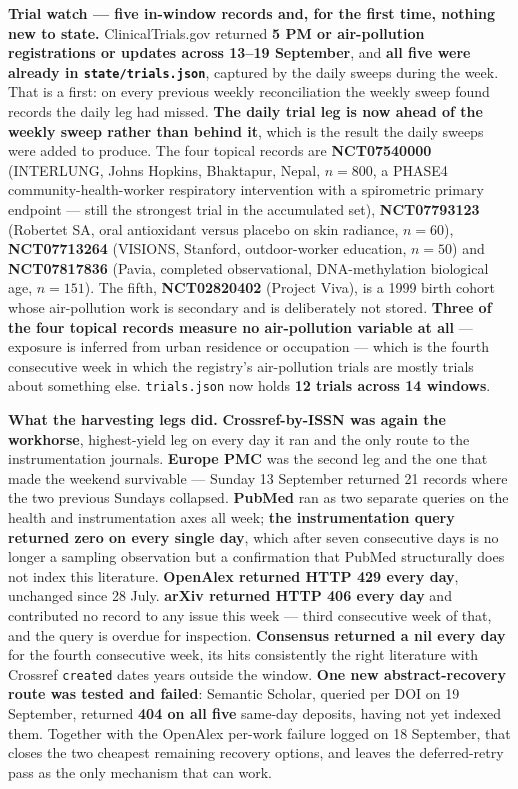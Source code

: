 \documentclass[10pt]{article}
\begin{document}
\vspace{1.5mm}
\textbf{Trial watch --- five in-window records and, for the first time, nothing new to
state.} ClinicalTrials.gov returned \textbf{5 PM or air-pollution registrations or updates
across 13--19 September}, and \textbf{all five were already in
\texttt{state/trials.json}}, captured by the daily sweeps during the week. That is a
first: on every previous weekly reconciliation the weekly sweep found records the daily
leg had missed. \textbf{The daily trial leg is now ahead of the weekly sweep rather than
behind it}, which is the result the daily sweeps were added to produce. The four topical
records are \textbf{NCT07540000} (INTERLUNG, Johns Hopkins, Bhaktapur, Nepal, $n=800$, a
PHASE4 community-health-worker respiratory intervention with a spirometric primary
endpoint --- still the strongest trial in the accumulated set), \textbf{NCT07793123}
(Robertet SA, oral antioxidant versus placebo on skin radiance, $n=60$),
\textbf{NCT07713264} (VISIONS, Stanford, outdoor-worker education, $n=50$) and
\textbf{NCT07817836} (Pavia, completed observational, DNA-methylation biological age,
$n=151$). The fifth, \textbf{NCT02820402} (Project Viva), is a 1999 birth cohort whose
air-pollution work is secondary and is deliberately not stored. \textbf{Three of the four
topical records measure no air-pollution variable at all} --- exposure is inferred from
urban residence or occupation --- which is the fourth consecutive week in which the
registry's air-pollution trials are mostly trials about something else.
\texttt{trials.json} now holds \textbf{12 trials across 14 windows}.

\vspace{1.5mm}
\textbf{What the harvesting legs did.} \textbf{Crossref-by-ISSN was again the workhorse},
highest-yield leg on every day it ran and the only route to the instrumentation journals.
\textbf{Europe PMC} was the second leg and the one that made the weekend survivable ---
Sunday 13 September returned 21 records where the two previous Sundays collapsed.
\textbf{PubMed} ran as two separate queries on the health and instrumentation axes all
week; \textbf{the instrumentation query returned zero on every single day}, which after
seven consecutive days is no longer a sampling observation but a confirmation that PubMed
structurally does not index this literature. \textbf{OpenAlex returned HTTP 429 every
day}, unchanged since 28 July. \textbf{arXiv returned HTTP 406 every day} and contributed
no record to any issue this week --- third consecutive week of that, and the query is
overdue for inspection. \textbf{Consensus returned a nil every day} for the fourth
consecutive week, its hits consistently the right literature with Crossref
\texttt{created} dates years outside the window. \textbf{One new abstract-recovery route
was tested and failed}: Semantic Scholar, queried per DOI on 19 September, returned
\textbf{404 on all five} same-day deposits, having not yet indexed them. Together with the
OpenAlex per-work failure logged on 18 September, that closes the two cheapest remaining
recovery options, and leaves the deferred-retry pass as the only mechanism that can work.
\end{document}
